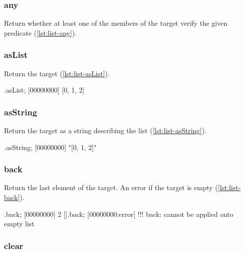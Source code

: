 \subsubsection{any}

Return whether at least one of the members of the target verify the
given predicate (\autoref{lst:list-any}).


\subsubsection{asList}

Return the target (\autoref{lst:list-asList}).

\begin{urbiscript}[caption=List.asList, label=lst:list-asList]
[0, 1, 2].asList;
[00000000] [0, 1, 2]
\end{urbiscript}

\subsubsection{asString}

Return the target as a string describing the list
(\autoref{lst:list-asString}).

\begin{urbiscript}[caption=List.asString, label=lst:list-asString]
[0, 1, 2].asString;
[00000000] "[0, 1, 2]"
\end{urbiscript}

\subsubsection{back}

Return the last element of the target. An error if the target is empty
(\autoref{lst:list-back}).

\begin{urbiscript}[caption=List.back, label=lst:list-back]
[0, 1, 2].back;
[00000000] 2
[].back;
[00000000:error] !!! back: cannot be applied onto empty list
\end{urbiscript}

\subsubsection{clear}

